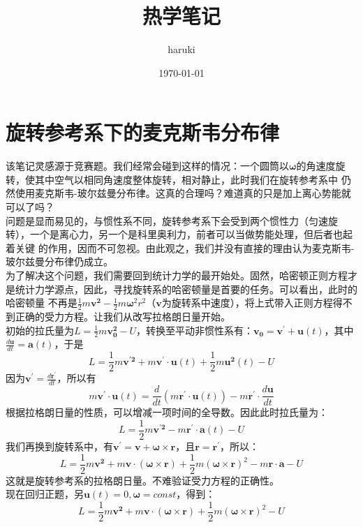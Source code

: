 \documentclass[utf8]{ctexart}
\title{热学笔记}
\author{haruki}
\date{\today}
\begin{document}
\maketitle
\tableofcontents
\section{旋转参考系下的麦克斯韦分布律}
\noindent 该笔记灵感源于竞赛题。我们经常会碰到这样的情况：一个圆筒以$\boldsymbol{\omega}$的角速度旋转，使其中空气以相同角速度整体旋转，相对静止，此时我们在旋转参考系中
仍然使用麦克斯韦-玻尔兹曼分布律。这真的合理吗？难道真的只是加上离心势能就可以了吗？\\
问题是显而易见的，与惯性系不同，旋转参考系下会受到两个惯性力（匀速旋转），一个是离心力，另一个是科里奥利力，前者可以当做势能处理，但后者也起着关键
的作用，因而不可忽视。由此观之，我们并没有直接的理由认为麦克斯韦-玻尔兹曼分布律仍成立。\\
为了解决这个问题，我们需要回到统计力学的最开始处。固然，哈密顿正则方程才是统计力学源点，因此，寻找旋转系的哈密顿量是首要的任务。可以看出，此时的哈密顿量
不再是$\frac{1}{2}m\boldsymbol{v^2}-\frac{1}{2}m\boldsymbol{\omega} ^{2}r^2$（$\boldsymbol{v}$为旋转系中速度），将上式带入正则方程得不到正确的受力方程。让我们从改写拉格朗日量开始。\\
初始的拉氏量为$L=\frac{1}{2}m\boldsymbol{v_0^{2}}-U$，转换至平动非惯性系有：$\boldsymbol{v_0}=\boldsymbol{v^{'}}+\boldsymbol{u}(t)$，其中$\frac{d\boldsymbol{u}}{dt}=\boldsymbol{a}(t)$，于是
$$
L=\frac{1}{2}m\boldsymbol{v^{'2}}+m\boldsymbol{v^{'}}\cdot\boldsymbol{u}(t)+\frac{1}{2}m\boldsymbol{u^{2}}(t)-U
$$
因为$\boldsymbol{v^{'}}=\frac{d\boldsymbol{r^{'}}}{dt}$，所以有
$$
m\boldsymbol{v^{'}}\cdot\boldsymbol{u}(t)=\frac{d}{dt}(m\boldsymbol{r^{'}}\cdot\boldsymbol{u}(t))-m\boldsymbol{r^{'}}\cdot\frac{d\boldsymbol{u}}{dt}
$$
根据拉格朗日量的性质，可以增减一项时间的全导数。因此此时拉氏量为：
$$
L=\frac{1}{2}m\boldsymbol{v^{'2}}-m\boldsymbol{r^{'}}\cdot\boldsymbol{a}(t)-U
$$
我们再换到旋转系中，有$\boldsymbol{v^{'}}=\boldsymbol{v}+\boldsymbol{\omega}\times\boldsymbol{r}$，且$\boldsymbol{r}=\boldsymbol{r^{'}}$，所以：
$$
L=\frac{1}{2}m\boldsymbol{v^{2}}+m\boldsymbol{v}\cdot(\boldsymbol{\omega}\times\boldsymbol{r})+\frac{1}{2}m(\boldsymbol{\boldsymbol{\omega}\times\boldsymbol{r}})^2-m\boldsymbol{r}\cdot\boldsymbol{a}-U
$$
这就是旋转参考系的拉格朗日量。不难验证受力方程的正确性。\\
现在回归正题，另$\boldsymbol{u}(t)=0,\boldsymbol{\omega}=const$，得到：
$$
L=\frac{1}{2}m\boldsymbol{v^{2}}+m\boldsymbol{v}\cdot(\boldsymbol{\omega}\times\boldsymbol{r})+\frac{1}{2}m(\boldsymbol{\boldsymbol{\omega}\times\boldsymbol{r}})^2-U
$$
\end{document}

